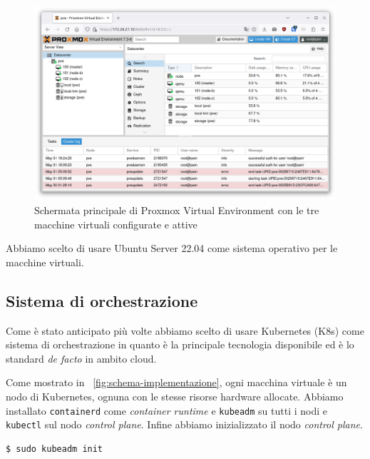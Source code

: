 \documentclass[12pt, hidelinks]{report}
\begin{document}
\begin{figure}
    \centering
    \includegraphics[width=\linewidth]{13_schemata-proxmox.png}
    \caption{Schermata principale di Proxmox Virtual Environment con le tre macchine virtuali configurate e attive}
    \label{fig:schermata-proxmox}
\end{figure}

Abbiamo scelto di usare Ubuntu Server 22.04 come sistema operativo per le macchine virtuali.

\subsection{Sistema di orchestrazione}
Come è stato anticipato più volte abbiamo scelto di usare Kubernetes (K8s) come sistema di orchestrazione in quanto è la principale tecnologia disponibile ed è lo standard \textit{de facto} in ambito cloud. 

Come mostrato in \figurename~\ref{fig:schema-implementazione}, ogni macchina virtuale è un nodo di Kubernetes, ognuna con le stesse risorse hardware allocate. Abbiamo installato \texttt{containerd} come \textit{container runtime} e \texttt{kubeadm} su tutti i nodi e \texttt{kubectl} sul nodo \textit{control plane}.
Infine abbiamo inizializzato il nodo \textit{control plane}.
\begin{lstlisting}[language=bash]
  $ sudo kubeadm init
\end{lstlisting}
\end{document}
